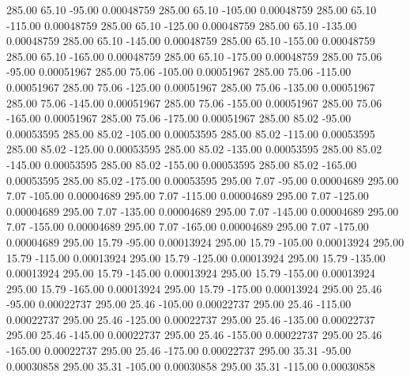     285.00     65.10    -95.00     0.00048759
    285.00     65.10   -105.00     0.00048759
    285.00     65.10   -115.00     0.00048759
    285.00     65.10   -125.00     0.00048759
    285.00     65.10   -135.00     0.00048759
    285.00     65.10   -145.00     0.00048759
    285.00     65.10   -155.00     0.00048759
    285.00     65.10   -165.00     0.00048759
    285.00     65.10   -175.00     0.00048759
    285.00     75.06    -95.00     0.00051967
    285.00     75.06   -105.00     0.00051967
    285.00     75.06   -115.00     0.00051967
    285.00     75.06   -125.00     0.00051967
    285.00     75.06   -135.00     0.00051967
    285.00     75.06   -145.00     0.00051967
    285.00     75.06   -155.00     0.00051967
    285.00     75.06   -165.00     0.00051967
    285.00     75.06   -175.00     0.00051967
    285.00     85.02    -95.00     0.00053595
    285.00     85.02   -105.00     0.00053595
    285.00     85.02   -115.00     0.00053595
    285.00     85.02   -125.00     0.00053595
    285.00     85.02   -135.00     0.00053595
    285.00     85.02   -145.00     0.00053595
    285.00     85.02   -155.00     0.00053595
    285.00     85.02   -165.00     0.00053595
    285.00     85.02   -175.00     0.00053595
    295.00      7.07    -95.00     0.00004689
    295.00      7.07   -105.00     0.00004689
    295.00      7.07   -115.00     0.00004689
    295.00      7.07   -125.00     0.00004689
    295.00      7.07   -135.00     0.00004689
    295.00      7.07   -145.00     0.00004689
    295.00      7.07   -155.00     0.00004689
    295.00      7.07   -165.00     0.00004689
    295.00      7.07   -175.00     0.00004689
    295.00     15.79    -95.00     0.00013924
    295.00     15.79   -105.00     0.00013924
    295.00     15.79   -115.00     0.00013924
    295.00     15.79   -125.00     0.00013924
    295.00     15.79   -135.00     0.00013924
    295.00     15.79   -145.00     0.00013924
    295.00     15.79   -155.00     0.00013924
    295.00     15.79   -165.00     0.00013924
    295.00     15.79   -175.00     0.00013924
    295.00     25.46    -95.00     0.00022737
    295.00     25.46   -105.00     0.00022737
    295.00     25.46   -115.00     0.00022737
    295.00     25.46   -125.00     0.00022737
    295.00     25.46   -135.00     0.00022737
    295.00     25.46   -145.00     0.00022737
    295.00     25.46   -155.00     0.00022737
    295.00     25.46   -165.00     0.00022737
    295.00     25.46   -175.00     0.00022737
    295.00     35.31    -95.00     0.00030858
    295.00     35.31   -105.00     0.00030858
    295.00     35.31   -115.00     0.00030858
